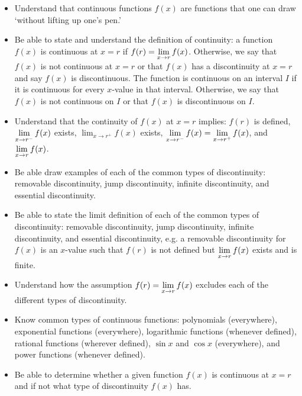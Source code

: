 \documentclass[11pt,letterpaper]{article}
\begin{document}
\begin{itemize}
\item Understand that continuous functions $f(x)$ are functions that one can draw `without lifting up one's pen.' 

\item Be able to state and understand the definition of continuity: a function $f(x)$ is continuous at $x= r$ if $\displaystyle f(r)= \lim_{x \to r} f(x)$. Otherwise, we say that $f(x)$ is not continuous at $x= r$ or that $f(x)$ has a discontinuity at $x= r$ and say $f(x)$ is discontinuous. The function is continuous on an interval $I$ if it is continuous for every $x$-value in that interval. Otherwise, we say that $f(x)$ is not continuous on $I$ or that $f(x)$ is discontinuous on $I$. 

\item Understand that the continuity of $f(x)$ at $x= r$ implies: $f(r)$ is defined, $\displaystyle\lim_{x \to r^-} f(x)$ exists, $\lim_{x \to r^+} f(x)$ exists, $\displaystyle\lim_{x \to r^-} f(x)= \lim_{x \to r^+} f(x)$, and $\displaystyle \lim_{x \to r} f(x)$. 

\item Be able draw examples of each of the common types of discontinuity: removable discontinuity, jump discontinuity, infinite discontinuity, and essential discontinuity. 

\item Be able to state the limit definition of each of the common types of discontinuity: removable discontinuity, jump discontinuity, infinite discontinuity, and essential discontinuity, e.g. a removable discontinuity for $f(x)$ is an $x$-value such that $f(r)$ is not defined but $\displaystyle\lim_{x \to r} f(x)$ exists and is finite. 

\item Understand how the assumption $\displaystyle f(r)= \lim_{x \to r} f(x)$ excludes each of the different types of discontinuity. 

\item Know common types of continuous functions: polynomials (everywhere), exponential functions (everywhere), logarithmic functions (whenever defined), rational functions (wherever defined), $\sin x$ and $\cos x$ (everywhere), and power functions (whenever defined). 

\item Be able to determine whether a given function $f(x)$ is continuous at $x= r$ and if not what type of discontinuity $f(x)$ has. 


\end{itemize}
\end{document}
